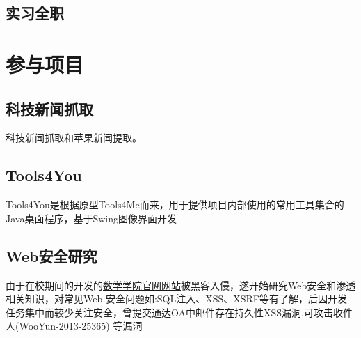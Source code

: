 \documentclass[11pt,a4paper,kai]{moderncv}   %
\begin{document}
\begin{CJK}{UTF8}{kai}
\subsection{实习全职}

\section{参与项目}
\subsection{科技新闻抓取}
科技新闻抓取和苹果新闻提取。
\subsection{Tools4You}
 Tools4You是根据原型Tools4Me而来，用于提供项目内部使用的常用工具集合的Java桌面程序，基于Swing图像界面开发
\subsection{Web安全研究}
 由于在校期间的开发的\href{http://www.math.uestc.edu.cn}{数学学院官网网站}被黑客入侵，遂开始研究Web安全和渗透相关知识，对常见Web 安全问题如:SQL注入、XSS、XSRF等有了解，后因开发任务集中而较少关注安全，曾提交通达OA中邮件存在持久性XSS漏洞,可攻击收件人(WooYun-2013-25365) 等漏洞

\end{CJK}
\end{document}
